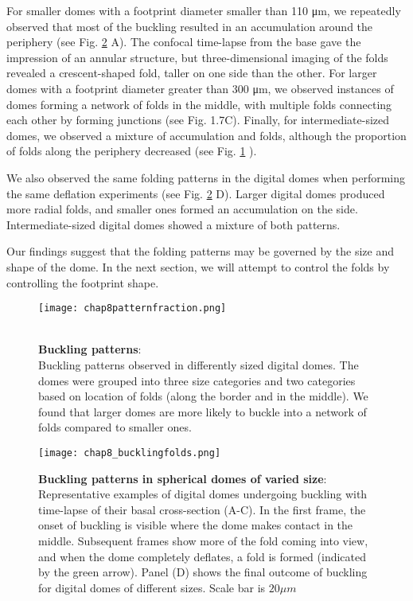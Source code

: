 For smaller domes with a footprint diameter smaller than 110 \unit{\um}, we repeatedly observed that most of the buckling resulted in an accumulation around the periphery (see Fig. \ref{fig_8_6} A). The confocal time-lapse from the base gave the impression of an annular structure, but three-dimensional imaging of the folds revealed a crescent-shaped fold, taller on one side than the other. For larger domes with a footprint diameter greater than 300 \unit{\um}, we observed instances of domes forming a network of folds in the middle, with multiple folds connecting each other by forming junctions (see Fig. 1.7C). Finally, for intermediate-sized domes, we observed a mixture of accumulation and folds, although the proportion of folds along the periphery decreased (see Fig. \ref{fig_8_5} ).

We also observed the same folding patterns in the digital domes when performing the same deflation experiments (see Fig. \ref{fig_8_6} D). Larger digital domes produced more radial folds, and smaller ones formed an accumulation on the side. Intermediate-sized digital domes showed a mixture of both patterns.

Our findings suggest that the folding patterns may be governed by the size and shape of the dome. In the next section, we will attempt to control the folds by controlling the footprint shape.

\begin{figure}[b!]
	\begin{minipage}[c]{0.5\textwidth}
		\texttt{[image: chap8patternfraction.png]}
	\end{minipage}\hfill
	\begin{minipage}[c]{0.45\textwidth}
		\caption{\\ \textbf{Buckling patterns}:\\ 
			Buckling patterns observed in differently sized digital domes. The domes were grouped into three size categories and two categories based on location of folds (along the border and in the middle). We found that larger domes are more likely to buckle into a network of folds compared to smaller ones.
		} \label{fig_8_5}
	\end{minipage}
\end{figure}

\newpage

\vspace{3cm}

\begin{figure}
	\centering
	\texttt{[image: chap8\_bucklingfolds.png]}
	\caption{\label{fig_8_6} \textbf{Buckling patterns in spherical domes of varied size}: Representative examples of digital domes undergoing buckling with time-lapse of their basal cross-section (A-C). In the first frame, the onset of buckling is visible where the dome makes contact in the middle. Subsequent frames show more of the fold coming into view, and when the dome completely deflates, a fold is formed (indicated by the green arrow). Panel (D) shows the final outcome of buckling for digital domes of different sizes. Scale bar is $20 \mu m$	}
\end{figure}



